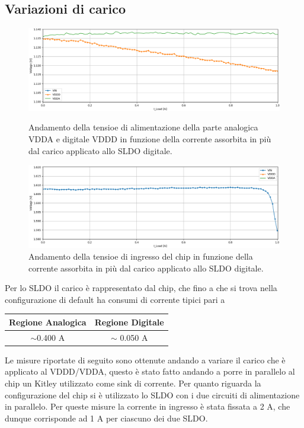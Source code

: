 \subsection{Variazioni di carico}
\begin{figure}
\centering
\includegraphics[width=\textwidth]{Immagini/LoadVDDD}
\caption{Andamento della tensioe di alimentazione della parte analogica VDDA e digitale VDDD in funzione della corrente assorbita in più dal carico applicato allo SLDO digitale.}
\label{LoadVDDD}
\includegraphics[width=\textwidth]{Immagini/LoadVIND}
\caption{Andamento della tensioe di ingresso del chip in funzione della corrente assorbita in più dal carico applicato allo SLDO digitale.}
\label{LoadVIND}
\end{figure}
Per lo SLDO il carico è rappresentato dal chip, che fino a che si trova nella configurazione di default ha consumi di corrente tipici pari a 
\begin{center}
\begin{tabular}{cc}
\hline
Regione Analogica & Regione Digitale \\ \hline
$\sim$0.400 A & $\sim$ 0.050 A\\ \hline     
\end{tabular}
\end{center}
Le misure riportate di seguito sono ottenute andando a variare il carico che è applicato al VDDD/VDDA, questo è stato fatto andando a porre in parallelo al chip un Kitley utilizzato come sink di corrente. 
Per quanto riguarda la configurazione del chip si è utilizzato lo SLDO con i due circuiti di alimentazione in parallelo. 
Per queste misure la corrente in ingresso è stata fissata a 2 A, che dunque corrisponde ad 1 A per ciascuno dei due SLDO. 
